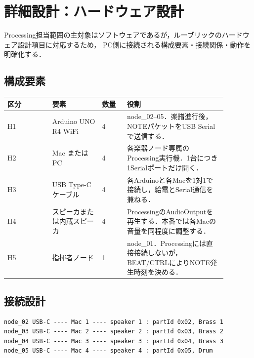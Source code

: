 \documentclass[a4paper,11pt]{jsarticle}
\begin{document}
\section{詳細設計：ハードウェア設計}

Processing担当範囲の主対象はソフトウェアであるが，ルーブリックのハードウェア設計項目に対応するため，
PC側に接続される構成要素・接続関係・動作を明確化する．

\subsection{構成要素}

\begin{longtable}{p{0.18\linewidth}p{0.20\linewidth}p{0.10\linewidth}p{0.40\linewidth}}
\hline
区分 & 要素 & 数量 & 役割 \\
\hline
\endhead
H1 & Arduino UNO R4 WiFi & 4 & node\_02--05．楽譜進行後，NOTEパケットをUSB Serialで送信する． \\
\hline
H2 & Mac またはPC & 4 & 各楽器ノード専属のProcessing実行機．1台につき1Serialポートだけ開く． \\
\hline
H3 & USB Type-Cケーブル & 4 & 各Arduinoと各Macを1対1で接続し，給電とSerial通信を兼ねる． \\
\hline
H4 & スピーカまたは内蔵スピーカ & 4 & ProcessingのAudioOutputを再生する．本番では各Macの音量を同程度に調整する． \\
\hline
H5 & 指揮者ノード & 1 & node\_01．Processingには直接接続しないが，BEAT/CTRLによりNOTE発生時刻を決める． \\
\hline
\end{longtable}

\subsection{接続設計}

\begin{lstlisting}[style=textdiagram, caption={Mac 4台構成の接続図}]
node_02 USB-C ---- Mac 1 ---- speaker 1 : partId 0x02, Brass 1
node_03 USB-C ---- Mac 2 ---- speaker 2 : partId 0x03, Brass 2
node_04 USB-C ---- Mac 3 ---- speaker 3 : partId 0x04, Brass 3
node_05 USB-C ---- Mac 4 ---- speaker 4 : partId 0x05, Drum
\end{lstlisting}
\end{document}
